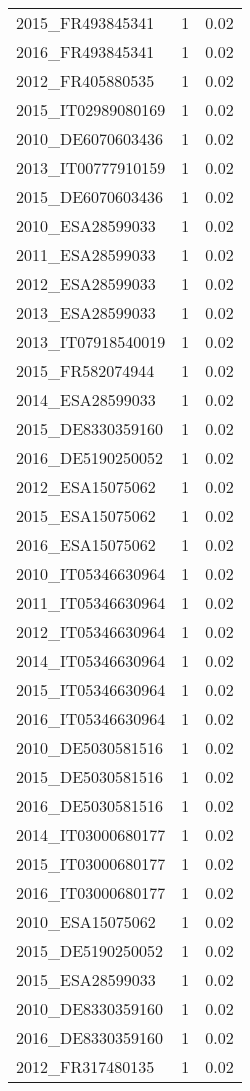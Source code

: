 \begin{table*}[htbp]
\begin{tabular}{lrr}
2015_FR493845341 & 1 & 0.02 \\
2016_FR493845341 & 1 & 0.02 \\
2012_FR405880535 & 1 & 0.02 \\
2015_IT02989080169 & 1 & 0.02 \\
2010_DE6070603436 & 1 & 0.02 \\
2013_IT00777910159 & 1 & 0.02 \\
2015_DE6070603436 & 1 & 0.02 \\
2010_ESA28599033 & 1 & 0.02 \\
2011_ESA28599033 & 1 & 0.02 \\
2012_ESA28599033 & 1 & 0.02 \\
2013_ESA28599033 & 1 & 0.02 \\
2013_IT07918540019 & 1 & 0.02 \\
2015_FR582074944 & 1 & 0.02 \\
2014_ESA28599033 & 1 & 0.02 \\
2015_DE8330359160 & 1 & 0.02 \\
2016_DE5190250052 & 1 & 0.02 \\
2012_ESA15075062 & 1 & 0.02 \\
2015_ESA15075062 & 1 & 0.02 \\
2016_ESA15075062 & 1 & 0.02 \\
2010_IT05346630964 & 1 & 0.02 \\
2011_IT05346630964 & 1 & 0.02 \\
2012_IT05346630964 & 1 & 0.02 \\
2014_IT05346630964 & 1 & 0.02 \\
2015_IT05346630964 & 1 & 0.02 \\
2016_IT05346630964 & 1 & 0.02 \\
2010_DE5030581516 & 1 & 0.02 \\
2015_DE5030581516 & 1 & 0.02 \\
2016_DE5030581516 & 1 & 0.02 \\
2014_IT03000680177 & 1 & 0.02 \\
2015_IT03000680177 & 1 & 0.02 \\
2016_IT03000680177 & 1 & 0.02 \\
2010_ESA15075062 & 1 & 0.02 \\
2015_DE5190250052 & 1 & 0.02 \\
2015_ESA28599033 & 1 & 0.02 \\
2010_DE8330359160 & 1 & 0.02 \\
2016_DE8330359160 & 1 & 0.02 \\
2012_FR317480135 & 1 & 0.02 \\

\end{tabular}
\end{table*}
